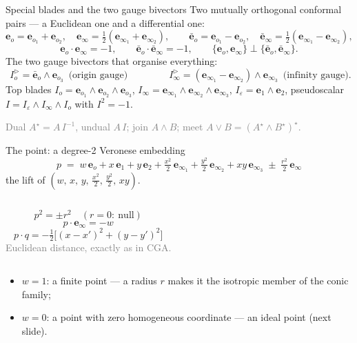 \documentclass[aspectratio=169, 10pt]{beamer}
\newcommand{\eo}{\mathbf{e}_o}
\newcommand{\einff}{\mathbf{e}_\infty}
\newcommand{\eob}{\bar{\mathbf{e}}_o}
\newcommand{\einfb}{\bar{\mathbf{e}}_\infty}
\newcommand{\eoi}[1]{\mathbf{e}_{o_{#1}}}
\newcommand{\einfi}[1]{\mathbf{e}_{\infty_{#1}}}
\newcommand{\Iod}{I_o^{\triangleright}}
\newcommand{\Iinfd}{I_\infty^{\triangleright}}
\newcommand{\Io}{I_o}
\newcommand{\Iinf}{I_\infty}
\newcommand{\Ieps}{I_\varepsilon}
\newcommand{\wed}{\wedge}
\newcommand{\meet}{\vee}
\newcommand{\dotp}{\cdot}
\begin{document}
\begin{frame}[t]{Special blades and the two gauge bivectors}
  Two mutually orthogonal conformal pairs --- a Euclidean one and a differential one:
  \[
    \eo=\eoi1+\eoi2,\quad \einff=\tfrac12(\einfi1+\einfi2),\qquad
    \eob=\eoi1-\eoi2,\quad \einfb=\tfrac12(\einfi1-\einfi2),
  \]
  \[
    \eo\dotp\einff=-1,\qquad \eob\dotp\einfb=-1,\qquad \{\eo,\einff\}\perp\{\eob,\einfb\}.
  \]
  The two \alert{gauge bivectors} that organise everything:
  \[
    \boxed{\;\Iod=\eob\wed\eoi3\;}\ \text{(origin gauge)}
    \qquad\qquad
    \boxed{\;\Iinfd=(\einfi1-\einfi2)\wed\einfi3\;}\ \text{(infinity gauge)} .
  \]
  Top blades $\Io=\eoi1\wed\eoi2\wed\eoi3$, $\Iinf=\einfi1\wed\einfi2\wed\einfi3$,
  $\Ieps=\mathbf{e}_1\wed\mathbf{e}_2$, pseudoscalar
  $I=\Ieps\wed\Iinf\wed\Io$ with $I^2=-1$.
  \vspace{0.15cm}

  \textcolor{gray}{Dual $A^\star=A\,I^{-1}$, undual $A\,I$; join $A\wed B$; meet $A\meet B=(A^\star\wed B^\star)^\star$.}
\end{frame}

\begin{frame}[t]{The point: a degree-2 Veronese embedding}
  \[
    \boxed{\;
    p \;=\; w\,\eo + x\,\mathbf{e}_1 + y\,\mathbf{e}_2
       + \tfrac{x^2}{2}\,\einfi1 + \tfrac{y^2}{2}\,\einfi2 + xy\,\einfi3
       \;\pm\;\tfrac{r^2}{2}\,\einff
    \;}
  \]
  the lift of $(w,\,x,\,y,\,\tfrac{x^2}2,\,\tfrac{y^2}2,\,xy)$.
  \vspace{0.3cm}
  \begin{columns}[T]
      \[ p^2 = \pm r^2 \quad (r{=}0:\ \text{null}) \]
      \[ p\dotp\einff = -w \]
      \[ p\dotp q = -\tfrac12\big[(x{-}x')^2+(y{-}y')^2\big] \]
      \textcolor{gray}{Euclidean distance, exactly as in CGA.}
  \end{columns}
  \vspace{0.25cm}
  \begin{itemize}\setlength\itemsep{0.2em}
    \item $w=1$: a \alert{finite point} --- a radius $r$ makes it the isotropic member of the conic family;
    \item $w=0$: a \alert{point with zero homogeneous coordinate} --- an ideal point (next slide).
  \end{itemize}
\end{frame}
\end{document}
